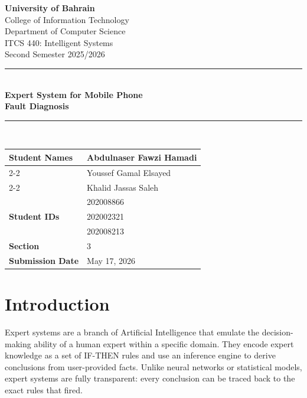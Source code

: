 \documentclass[12pt,a4paper]{article}
\begin{document}
\begin{center}
    {\Large\bfseries University of Bahrain}\\[4pt]
    College of Information Technology\\
    Department of Computer Science\\[6pt]
    {\large ITCS 440: Intelligent Systems}\\
    Second Semester 2025/2026\\[8pt]
    \rule{\linewidth}{0.8pt}\\[6pt]
    {\LARGE\bfseries Expert System for Mobile Phone\\[4pt] Fault Diagnosis}\\[6pt]
    \rule{\linewidth}{0.8pt}\\[10pt]
\end{center}

\noindent
\begin{tabular}{|l|p{9cm}|}
\hline
\multirow{3}{*}{\textbf{Student Names}} & Abdulnaser Fawzi Hamadi \\
\cline{2-2}
 & Youssef Gamal Elsayed \\
\cline{2-2}
 & Khalid Jassas Saleh \\
\hline
\multirow{3}{*}{\textbf{Student IDs}} & 202008866 \\
\cline{2-2}
 & 202002321 \\
\cline{2-2}
 & 202008213 \\
\hline
\textbf{Section}      & 3 \\
\hline
\textbf{Submission Date} & May 17, 2026 \\
\hline
\end{tabular}

\bigskip

\section{Introduction}

Expert systems are a branch of Artificial Intelligence that emulate the decision-making
ability of a human expert within a specific domain. They encode expert knowledge as a
set of IF-THEN rules and use an inference engine to derive conclusions from user-provided
facts. Unlike neural networks or statistical models, expert systems are fully
transparent: every conclusion can be traced back to the exact rules that fired.
\end{document}
